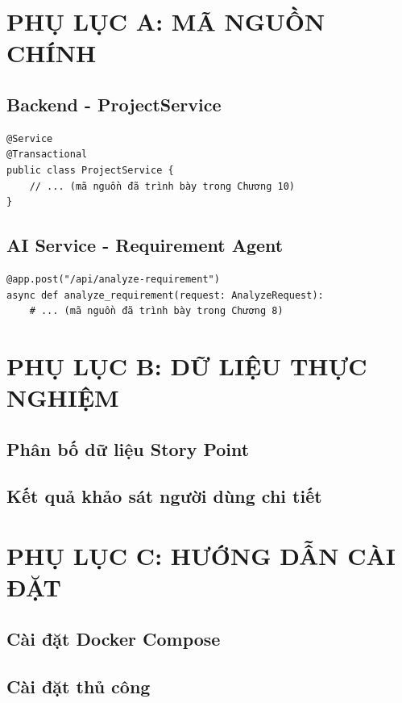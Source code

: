 \documentclass[12pt,a4paper]{report}
\begin{document}
\appendix
\chapter{PHỤ LỤC A: MÃ NGUỒN CHÍNH}

\section{Backend - ProjectService}

\begin{verbatim}
@Service
@Transactional
public class ProjectService {
    // ... (mã nguồn đã trình bày trong Chương 10)
}
\end{verbatim}

\section{AI Service - Requirement Agent}

\begin{verbatim}
@app.post("/api/analyze-requirement")
async def analyze_requirement(request: AnalyzeRequest):
    # ... (mã nguồn đã trình bày trong Chương 8)
\end{verbatim}

\chapter{PHỤ LỤC B: DỮ LIỆU THỰC NGHIỆM}

\section{Phân bố dữ liệu Story Point}

\section{Kết quả khảo sát người dùng chi tiết}

\chapter{PHỤ LỤC C: HƯỚNG DẪN CÀI ĐẶT}

\section{Cài đặt Docker Compose}

\section{Cài đặt thủ công}

\end{document}
